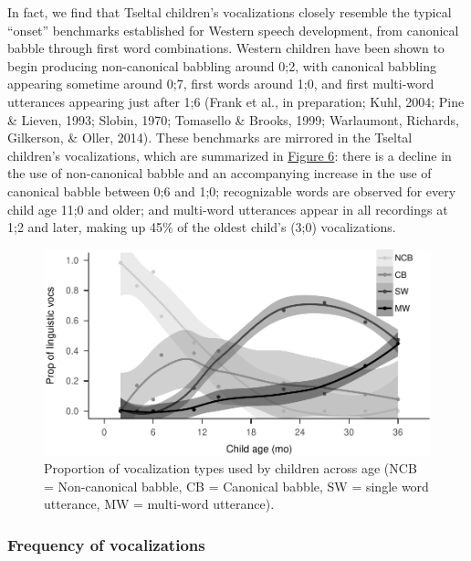\documentclass[floatsintext,man]{apa6}
\theoremstyle{definition}
\theoremstyle{definition}
\theoremstyle{definition}
\theoremstyle{remark}
\begin{document}
In fact, we find that Tseltal children's vocalizations closely resemble
the typical \enquote{onset} benchmarks established for Western speech
development, from canonical babble through first word combinations.
Western children have been shown to begin producing non-canonical
babbling around 0;2, with canonical babbling appearing sometime around
0;7, first words around 1;0, and first multi-word utterances appearing
just after 1;6 (Frank et al., in preparation; Kuhl, 2004; Pine \&
Lieven, 1993; Slobin, 1970; Tomasello \& Brooks, 1999; Warlaumont,
Richards, Gilkerson, \& Oller, 2014). These benchmarks are mirrored in
the Tseltal children's vocalizations, which are summarized in
\protect\hyperlink{fig6}{Figure 6}: there is a decline in the use of
non-canonical babble and an accompanying increase in the use of
canonical babble between 0;6 and 1;0; recognizable words are observed
for every child age 11;0 and older; and multi-word utterances appear in
all recordings at 1;2 and later, making up 45\% of the oldest child's
(3;0) vocalizations.

\begin{figure}
\centering
\includegraphics{Tseltal-CLE_files/figure-latex/fig6-1.pdf}
\caption{\label{fig:fig6}Proportion of vocalization types used by children
across age (NCB = Non-canonical babble, CB = Canonical babble, SW =
single word utterance, MW = multi-word utterance).}
\end{figure}

\subsubsection{Frequency of
vocalizations}\label{frequency-of-vocalizations}
\end{document}
